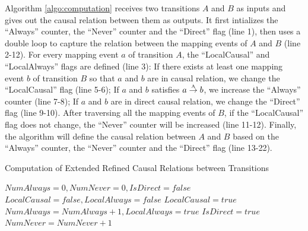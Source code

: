 \documentclass{llncs}
\begin{document}
Algorithm \ref{algo:computation} receives two transitions $A$ and $B$ as inputs and gives out the causal relation between them as outputs. It first intializes the ``Always'' counter, the ``Never'' counter and the ``Direct'' flag (line 1), then uses a double loop to capture the relation between the mapping events of $A$ and $B$ (line 2-12). For every mapping event $a$ of transition $A$, the ``LocalCausal'' and ``LocalAlways'' flags are defined (line 3): If there exists at least one mapping event $b$ of transition $B$ so that $a$ and $b$ are in causal relation, we change the ``LocalCausal'' flag (line 5-6); If $a$ and $b$ satisfies $a\overset{\text{\tiny{A}}}{\rightarrow}b$, we increase the ``Always'' counter (line 7-8); If $a$ and $b$ are in direct causal relation, we change the ``Direct'' flag (line 9-10). After traversing all the mapping events of $B$, if the ``LocalCausal'' flag does not change, the ``Never'' counter will be increased (line 11-12). Finally, the algorithm will define the causal relation between $A$ and $B$ based on the ``Always'' counter, the ``Never'' counter and the ``Direct'' flag (line 13-22).

\begin{algorithm}[htbp]
	\LinesNumbered
	\caption{Computation of Extended Refined Causal Relations between Transitions\label{algo:computation}}
	$NumAlways=0,NumNever=0,IsDirect=false$\;
	 {
		$LocalCausal=false,LocalAlways=false$\;
		 {
			 {
				$LocalCausal=true$\;
			}
			 {
				$NumAlways=NumAlways+1,LocalAlways=true$\;
			}
			 {
				$IsDirect=true$\;
			}
		}
		 {
			$NumNever=NumNever+1$\;
		}
	}
	 {
	}  {
	}  {
	}  {
	} 
\end{algorithm}
\end{document}
